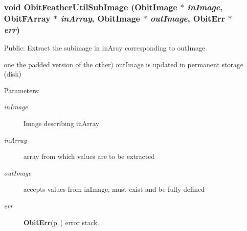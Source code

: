 \subsubsection{\setlength{\rightskip}{0pt plus 5cm}void Obit\-Feather\-Util\-Sub\-Image ({\bf Obit\-Image} $\ast$ {\em in\-Image}, {\bf Obit\-FArray} $\ast$ {\em in\-Array}, {\bf Obit\-Image} $\ast$ {\em out\-Image}, {\bf Obit\-Err} $\ast$ {\em err})}\label{ObitFeatherUtil_8h_a11}


Public: Extract the subimage in in\-Aray corresponding to out\-Image. 

one the padded version of the other) out\-Image is updated in permanent storage (disk) \begin{Desc}
\item[Parameters:]
\begin{description}
\item[{\em in\-Image}]Image describing in\-Array \item[{\em in\-Array}]array from which values are to be extracted \item[{\em out\-Image}]accepts values from in\-Image, must exist and be fully defined \item[{\em err}]{\bf Obit\-Err}{\rm (p.\,\pageref{structObitErr})} error stack. \end{description}
\end{Desc}
